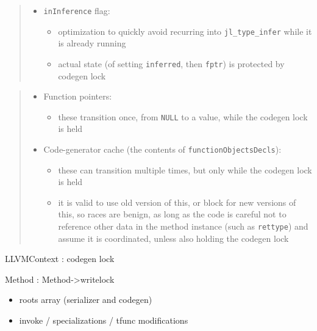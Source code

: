 \begin{quote}
\begin{itemize}
\item \texttt{inInference} flag:

\begin{itemize}
\item optimization to quickly avoid recurring into \texttt{jl\_type\_infer} while it is already running


\item actual state (of setting \texttt{inferred}, then \texttt{fptr}) is protected by codegen lock

\end{itemize}
\end{itemize}
\end{quote}


\begin{quote}
\begin{itemize}
\item Function pointers:

\begin{itemize}
\item these transition once, from \texttt{NULL} to a value, while the codegen lock is held

\end{itemize}

\item Code-generator cache (the contents of \texttt{functionObjectsDecls}):

\begin{itemize}
\item these can transition multiple times, but only while the codegen lock is held


\item it is valid to use old version of this, or block for new versions of this, so races are benign, as long as the code is careful not to reference other data in the method instance (such as \texttt{rettype}) and assume it is coordinated, unless also holding the codegen lock

\end{itemize}
\end{itemize}
\end{quote}


LLVMContext : codegen lock



Method : Method->writelock



\begin{itemize}
\item roots array (serializer and codegen)


\item invoke / specializations / tfunc modifications

\end{itemize}


